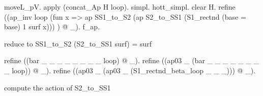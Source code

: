 \begin{coqdoccode}
\begin{coqdoccomment}
moveL\_pV.\coqdocindent{0.50em}
apply\coqdocindent{0.50em}
(concat\_Ap\coqdocindent{0.50em}
H\coqdocindent{0.50em}
loop).\coqdoceol
\coqdocindent{1.00em}
simpl.\coqdocindent{0.50em}
hott\_simpl.\coqdocindent{0.50em}
clear\coqdocindent{0.50em}
H.\coqdoceol
\coqdocindent{1.00em}
refine\coqdocindent{0.50em}
((ap\_inv\coqdocindent{0.50em}
loop\coqdocindent{0.50em}
\coqdoceol
\coqdocindent{9.00em}
(fun\coqdocindent{0.50em}
x\coqdocindent{0.50em}
=>\coqdocindent{0.50em}
ap\coqdocindent{0.50em}
SS1\_to\_S2\coqdocindent{0.50em}
(ap\coqdocindent{0.50em}
S2\_to\_SS1\coqdocindent{0.50em}
(S1\_rectnd\coqdocindent{0.50em}
(base\coqdocindent{0.50em}
=\coqdocindent{0.50em}
base)\coqdocindent{0.50em}
1\coqdocindent{0.50em}
surf\coqdocindent{0.50em}
x)))\coqdoceol
\coqdocindent{9.00em}
)\coqdocindent{0.50em}
@\coqdocindent{0.50em}
\_).\coqdocindent{0.50em}
\coqdoceol
\coqdocindent{1.00em}
f\_ap.\coqdoceol
\coqdoceol
\coqdocindent{1.00em}
\begin{coqdoccomment}
\coqdocindent{0.50em}
reduce\coqdocindent{0.50em}
to\coqdocindent{0.50em}
SS1\_to\_S2\coqdocindent{0.50em}
(S2\_to\_SS1\coqdocindent{0.50em}
surf)\coqdocindent{0.50em}
=\coqdocindent{0.50em}
surf\coqdocindent{0.50em}
\end{coqdoccomment}
\coqdoceol
\coqdocindent{1.00em}
refine\coqdocindent{0.50em}
((bar\coqdocindent{0.50em}
\_\coqdocindent{0.50em}
\_\coqdocindent{0.50em}
\_\coqdocindent{0.50em}
\_\coqdocindent{0.50em}
\_\coqdocindent{0.50em}
\_\coqdocindent{0.50em}
\_\coqdocindent{0.50em}
\_\coqdocindent{0.50em}
loop)\coqdocindent{0.50em}
@\coqdocindent{0.50em}
\_).\coqdoceol
\coqdocindent{1.00em}
refine\coqdocindent{0.50em}
((ap03\coqdocindent{0.50em}
\_\coqdocindent{0.50em}
(bar\coqdocindent{0.50em}
\_\coqdocindent{0.50em}
\_\coqdocindent{0.50em}
\_\coqdocindent{0.50em}
\_\coqdocindent{0.50em}
\_\coqdocindent{0.50em}
\_\coqdocindent{0.50em}
\_\coqdocindent{0.50em}
\_\coqdocindent{0.50em}
loop))\coqdocindent{0.50em}
@\coqdocindent{0.50em}
\_).\coqdoceol
\coqdocindent{1.00em}
refine\coqdocindent{0.50em}
((ap03\coqdocindent{0.50em}
\_\coqdocindent{0.50em}
(ap03\coqdocindent{0.50em}
\_\coqdocindent{0.50em}
(S1\_rectnd\_beta\_loop\coqdocindent{0.50em}
\_\coqdocindent{0.50em}
\_\coqdocindent{0.50em}
\_)))\coqdocindent{0.50em}
@\coqdocindent{0.50em}
\_).\coqdoceol
\coqdoceol
\coqdocindent{1.00em}
\begin{coqdoccomment}
\coqdocindent{0.50em}
compute\coqdocindent{0.50em}
the\coqdocindent{0.50em}
action\coqdocindent{0.50em}
of\coqdocindent{0.50em}
S2\_to\_SS1\coqdocindent{0.50em}
\end{coqdoccomment}

\end{coqdoccomment}
\end{coqdoccode}
